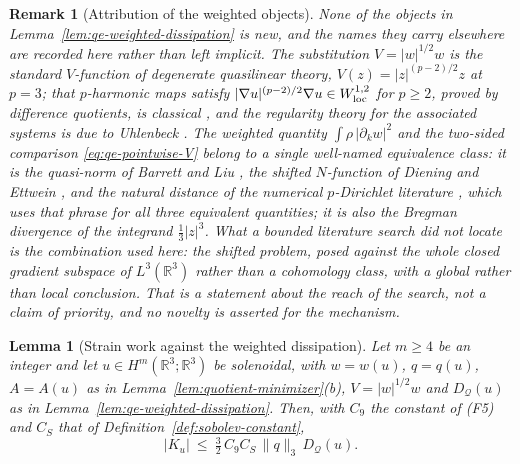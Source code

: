 \documentclass[11pt]{article}
\newtheorem{remark}[theorem]{Remark}
\newtheorem{lemma}[theorem]{Lemma}
\theoremstyle{definition}
\theoremstyle{plain}
\newcommand{\R}{\mathbb R}
\newcommand{\norm}[1]{\lVert #1\rVert}
\begin{document}
\begin{remark}[Attribution of the weighted objects]
\label{rem:qe-weighted-related}
None of the objects in Lemma~\ref{lem:qe-weighted-dissipation} is new, and the
names they carry elsewhere are recorded here rather than left implicit.  The
substitution $V=|w|^{1/2}w$ is the standard $V$-function of degenerate
quasilinear theory, $V(z)=|z|^{(p-2)/2}z$ at $p=3$; that $p$-harmonic maps
satisfy $|\nabla u|^{(p-2)/2}\nabla u\in W^{1,2}_{\rm loc}$ for $p\ge2$, proved
by difference quotients, is classical \cite[Thm.~4.1]{Lindqvist2019}, and the
regularity theory for the associated systems is due to Uhlenbeck
\cite{Uhlenbeck1977}.  The weighted quantity
$\int\rho\,|\partial_kw|^2$ and the two-sided comparison
\eqref{eq:qe-pointwise-V} belong to a single well-named equivalence class: it is
the \emph{quasi-norm} of Barrett and Liu \cite{BarrettLiu1994}, the
\emph{shifted $N$-function} of Diening and Ettwein \cite{DieningEttwein2008},
and the \emph{natural distance} of the numerical $p$-Dirichlet literature
\cite[Rem.~2.6]{Kaltenbach2024}, which uses that phrase for all three
equivalent quantities; it is also the Bregman divergence of the integrand
$\tfrac13|z|^3$.  What a bounded literature search did not locate is the
combination used here: the shifted problem, posed against the whole closed
gradient subspace of $L^3(\R^3)$ rather than a cohomology class, with a global
rather than local conclusion.  That is a statement about the reach of the
search, not a claim of priority, and no novelty is asserted for the mechanism.
\end{remark}

\begin{lemma}[Strain work against the weighted dissipation]
\label{lem:qe-strain-defect}
Let $m\ge4$ be an integer and let $u\in H^m(\R^3;\R^3)$ be solenoidal, with
$w=w(u)$, $q=q(u)$, $A=A(u)$ as in Lemma~\ref{lem:quotient-minimizer}(b),
$V=|w|^{1/2}w$ and $D_{\mathcal Q}(u)$ as in
Lemma~\ref{lem:qe-weighted-dissipation}.  Then, with $C_9$ the constant of
\textup{(F5)} and $C_S$ that of Definition~\ref{def:sobolev-constant},
\begin{equation}\label{eq:qe-strain-defect}
 |K_u|\ \le\ \tfrac32\,C_9C_S\,\norm q_3\,D_{\mathcal Q}(u).
\end{equation}
\end{lemma}
\end{document}
